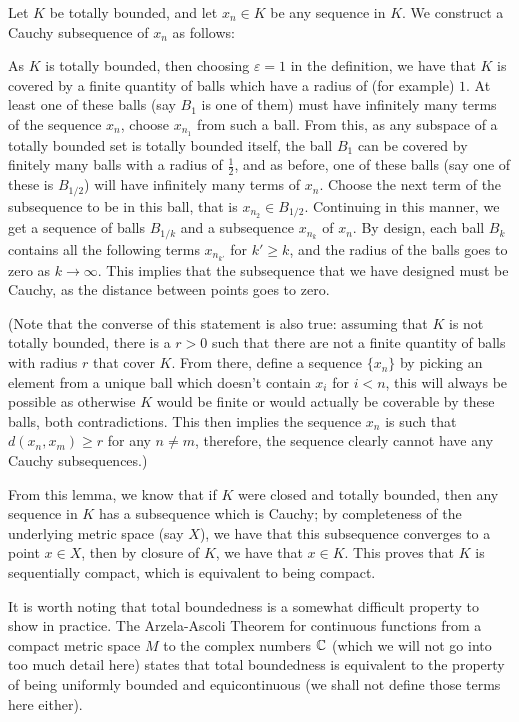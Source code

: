 \begin{bproof}{}{}
Let $K$ be totally bounded, and let $x_{n} \in K$ be any sequence in $K$. We construct a Cauchy subsequence of $x_{n}$ as follows:

As $K$ is totally bounded, then choosing $\varepsilon = 1$ in the definition, we have that $K$ is covered by a finite quantity of balls which have a radius of (for example) $1$. At least one of these balls (say $B_{1}$ is one of them) must have infinitely many terms of the sequence $x_{n}$, choose $x_{n_{1}}$ from such a ball.
From this, as any subspace of a totally bounded set is totally bounded itself, the ball $B_{1}$ can be covered by finitely many balls with a radius of $\frac{1}{2}$, and as before, one of these balls (say one of these is $B_{1/2}$) will have infinitely many terms of $x_{n}$. Choose the next term of the subsequence to be in this ball, that is $x_{n_{2}} \in B_{1/2}$.
Continuing in this manner, we get a sequence of balls $B_{1/k}$ and a subsequence $x_{n_{k}}$ of $x_{n}$. By design, each ball $B_{k}$ contains all the following terms $x_{n_{k'}}$ for $k' \geq k$, and the radius of the balls goes to zero as $k\to \infty$. This implies that the subsequence that we have designed must be Cauchy, as the distance between points goes to zero.

(Note that the converse of this statement is also true: assuming that $K$ is not totally bounded, there is a $r>0$ such that there are not a finite quantity of balls with radius $r$ that cover $K$. From there, define a sequence $\{ x_{n} \}$ by picking an element from a unique ball which doesn't contain $x_{i}$ for $i<n$, this will always be possible as otherwise $K$ would be finite or would actually be coverable by these balls, both contradictions. This then implies the sequence $x_{n}$ is such that $d(x_{n},x_{m}) \geq r$ for any $n \neq m$, therefore, the sequence clearly cannot have any Cauchy subsequences.)
\eop
\end{bproof}

From this lemma, we know that if $K$ were closed and totally bounded, then any sequence in $K$ has a subsequence which is Cauchy; by completeness of the underlying metric space (say $X$), we have that this subsequence converges to a point $x\in X$, then by closure of $K$, we have that $x\in K$. This proves that $K$ is sequentially compact, which is equivalent to being compact.



It is worth noting that total boundedness is a somewhat difficult property to show in practice. The Arzela-Ascoli Theorem for continuous functions from a compact metric space $M$ to the complex numbers $\mathbb{C}$ (which we will not go into too much detail here) states that total boundedness is equivalent to the property of being uniformly bounded and equicontinuous (we shall not define those terms here either).

